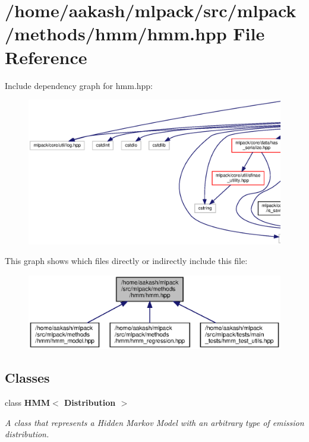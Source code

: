 \section{/home/aakash/mlpack/src/mlpack/methods/hmm/hmm.hpp File Reference}
\label{hmm_8hpp}
Include dependency graph for hmm.\+hpp\+:
\nopagebreak
\begin{figure}[H]
\begin{center}
\leavevmode
\includegraphics[width=350pt]{hmm_8hpp__incl}
\end{center}
\end{figure}
This graph shows which files directly or indirectly include this file\+:
\nopagebreak
\begin{figure}[H]
\begin{center}
\leavevmode
\includegraphics[width=350pt]{hmm_8hpp__dep__incl}
\end{center}
\end{figure}
\subsection*{Classes}
\begin{DoxyCompactItemize}
\item 
class \textbf{ H\+M\+M$<$ Distribution $>$}
\begin{DoxyCompactList}\small\item\em A class that represents a Hidden Markov Model with an arbitrary type of emission distribution. \end{DoxyCompactList}\end{DoxyCompactItemize}
